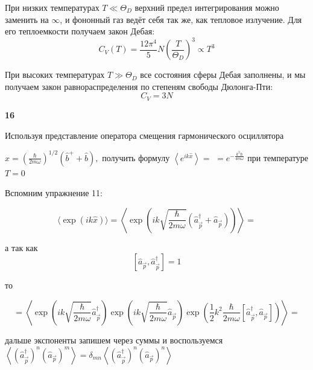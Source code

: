 \documentclass[a4paper,12pt]{article} %
\begin{document}
\begin{ttask}
При низких температурах $T \ll \Theta_{D}$ верхний предел интегрирования можно заменить на $\infty$, 
и фононный газ ведёт себя так же, как тепловое излучение. 
Для его теплоемкости получаем закон Дебая:
$$
C_{V}(T)=\frac{12 \pi^{4}}{5} N\left(\frac{T}{\Theta_{D}}\right)^{3} \propto T^{3}
$$




При высоких температурах $T \gg \Theta_{D}$ все состояния сферы Дебая заполнены, 
и мы получаем закон равнораспределения по степеням свободы Дюлонга-Пти:
$$
C_{V}=3 N
$$




\end{ttask}


\begin{ttask}\textbf{16}

Используя представление оператора смещения гармонического осциллятора 

$\hat{x}=\left(\frac{\hbar}{2 m \omega}\right)^{1 / 2}\left(\hat{b}^{+}+\hat{b}\right),$ 
получить формулу $\left\langle e^{i k \hat{x}}\right\rangle=$
$=e^{-\frac{k^{2} \hbar}{4 m \omega}}$ при температуре $T=0$











Вспомним упражнение 11:




$$
\langle\exp (i k \hat{x})\rangle=\left\langle\exp \left(i k \sqrt{\frac{\hbar}{2 m \omega}}\left(\hat{a}_{\vec{p}}^{\dagger}+\hat{a}_{\vec{p}}\right)\right)\right\rangle =
$$


а так как
$$
\left[\hat{a}_{\vec{p}}, \hat{a}_{\vec{p}}^{\dagger}\right]=1
$$

то



$$
=\left\langle\exp \left(i k \sqrt{\frac{\hbar}{2 m \omega}} \hat{a}_{\vec{p}}^{\dagger}\right) \exp \left(i k \sqrt{\frac{\hbar}{2 m \omega}} \hat{a}_{\vec{p}}\right) \exp \left(\frac{1}{2} k^{2} \frac{\hbar}{2 m \omega}\left[\hat{a}_{\vec{p}}^{\dagger}, \hat{a}_{\vec{p}}\right]\right)\right\rangle=
$$

дальше экспоненты запишем через суммы и воспользуемся
$\left\langle\left(\hat{a}_{\vec{p}}^{\dagger}\right)^{n}\left(\hat{a}_{\vec{p}}\right)^{m}\right\rangle
=
\delta_{m n}
\left\langle\left(\hat{a}_{\vec{p}}^{\dagger}\right)^{n}\left(\hat{a}_{\vec{p}}\right)^{n}\right\rangle$



\end{ttask}
\end{document}
